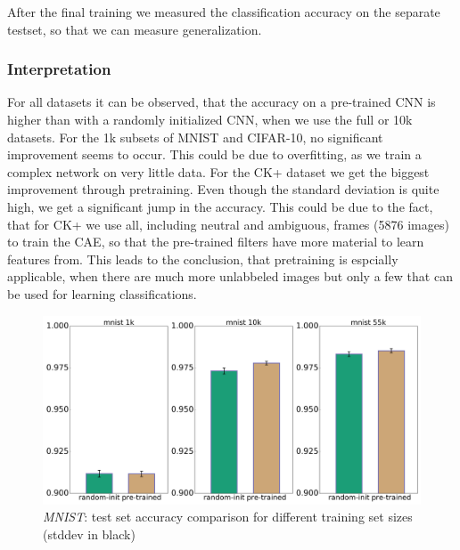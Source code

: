\documentclass[draft]{article}
\begin{document}
    After the final training we measured the classification accuracy on the separate testset, so that we can measure generalization.
    \subsubsection{Interpretation}
      For all datasets it can be observed, that the accuracy on a pre-trained CNN is higher than with a randomly initialized CNN, when we use the full or 10k datasets.
      For the 1k subsets of MNIST and CIFAR-10, no significant improvement seems to occur. This could
      be due to overfitting, as we train a complex network on very little data.
      For the CK+ dataset we get the biggest improvement through pretraining.
      Even though the standard deviation is quite high, we get a significant jump in the accuracy.
      This could be due to the fact, that for CK+ we use all, including neutral and ambiguous, frames (5876 images) to train the CAE, so that the pre-trained filters have more material to learn features from.
      This leads to the conclusion, that pretraining is espcially applicable, when there are much more unlabbeled images but only a few that can be used for learning classifications.

    \begin{figure}
      \includegraphics[width=\linewidth]{../box_plots/boxplots_mnist.png}
      \caption{\emph{MNIST}: test set accuracy comparison for different training set sizes (stddev in black)}
      \label{fig:mnist_plot}
    \end{figure}
\end{document}
